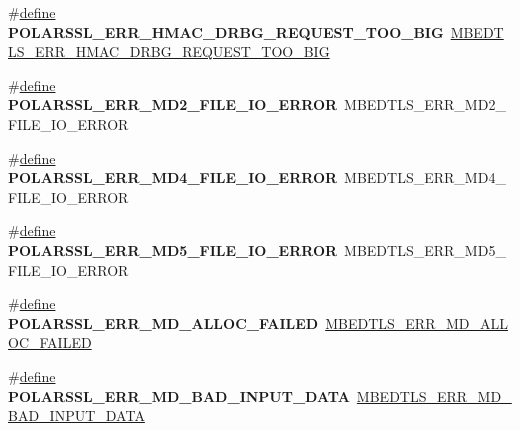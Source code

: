 \begin{DoxyCompactItemize}
\item 
\mbox{\label{compat-1_83_8h_a4d06fc2204001f56acb2a1eabfbbf036}} 
\#\hyperlink{structdefine}{define} {\bfseries P\+O\+L\+A\+R\+S\+S\+L\+\_\+\+E\+R\+R\+\_\+\+H\+M\+A\+C\+\_\+\+D\+R\+B\+G\+\_\+\+R\+E\+Q\+U\+E\+S\+T\+\_\+\+T\+O\+O\+\_\+\+B\+IG}~\hyperlink{hmac__drbg_8h_a9b2cc8521b7ac670ecf41c3788b0d847}{M\+B\+E\+D\+T\+L\+S\+\_\+\+E\+R\+R\+\_\+\+H\+M\+A\+C\+\_\+\+D\+R\+B\+G\+\_\+\+R\+E\+Q\+U\+E\+S\+T\+\_\+\+T\+O\+O\+\_\+\+B\+IG}
\item 
\mbox{\label{compat-1_83_8h_aaffd197bfef6b96a28efc3631c60ef48}} 
\#\hyperlink{structdefine}{define} {\bfseries P\+O\+L\+A\+R\+S\+S\+L\+\_\+\+E\+R\+R\+\_\+\+M\+D2\+\_\+\+F\+I\+L\+E\+\_\+\+I\+O\+\_\+\+E\+R\+R\+OR}~M\+B\+E\+D\+T\+L\+S\+\_\+\+E\+R\+R\+\_\+\+M\+D2\+\_\+\+F\+I\+L\+E\+\_\+\+I\+O\+\_\+\+E\+R\+R\+OR
\item 
\mbox{\label{compat-1_83_8h_a585cf248c4d1f41f682630c551c6f69c}} 
\#\hyperlink{structdefine}{define} {\bfseries P\+O\+L\+A\+R\+S\+S\+L\+\_\+\+E\+R\+R\+\_\+\+M\+D4\+\_\+\+F\+I\+L\+E\+\_\+\+I\+O\+\_\+\+E\+R\+R\+OR}~M\+B\+E\+D\+T\+L\+S\+\_\+\+E\+R\+R\+\_\+\+M\+D4\+\_\+\+F\+I\+L\+E\+\_\+\+I\+O\+\_\+\+E\+R\+R\+OR
\item 
\mbox{\label{compat-1_83_8h_ad26d8bd0d71d0fe8afaff96ec69c04fc}} 
\#\hyperlink{structdefine}{define} {\bfseries P\+O\+L\+A\+R\+S\+S\+L\+\_\+\+E\+R\+R\+\_\+\+M\+D5\+\_\+\+F\+I\+L\+E\+\_\+\+I\+O\+\_\+\+E\+R\+R\+OR}~M\+B\+E\+D\+T\+L\+S\+\_\+\+E\+R\+R\+\_\+\+M\+D5\+\_\+\+F\+I\+L\+E\+\_\+\+I\+O\+\_\+\+E\+R\+R\+OR
\item 
\mbox{\label{compat-1_83_8h_ad767a78d57c228eee2917bc5ffd8096c}} 
\#\hyperlink{structdefine}{define} {\bfseries P\+O\+L\+A\+R\+S\+S\+L\+\_\+\+E\+R\+R\+\_\+\+M\+D\+\_\+\+A\+L\+L\+O\+C\+\_\+\+F\+A\+I\+L\+ED}~\hyperlink{md_8h_a7e7a4f1a618afbb412ef82ca2e572140}{M\+B\+E\+D\+T\+L\+S\+\_\+\+E\+R\+R\+\_\+\+M\+D\+\_\+\+A\+L\+L\+O\+C\+\_\+\+F\+A\+I\+L\+ED}
\item 
\mbox{\label{compat-1_83_8h_ab5508cadb87f35ff11cd08a1a06f227f}} 
\#\hyperlink{structdefine}{define} {\bfseries P\+O\+L\+A\+R\+S\+S\+L\+\_\+\+E\+R\+R\+\_\+\+M\+D\+\_\+\+B\+A\+D\+\_\+\+I\+N\+P\+U\+T\+\_\+\+D\+A\+TA}~\hyperlink{md_8h_aeeb355bf3d3d39a2a6ba50544139b9a7}{M\+B\+E\+D\+T\+L\+S\+\_\+\+E\+R\+R\+\_\+\+M\+D\+\_\+\+B\+A\+D\+\_\+\+I\+N\+P\+U\+T\+\_\+\+D\+A\+TA}

\end{DoxyCompactItemize}
